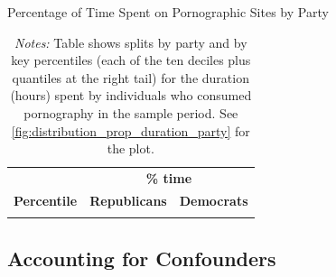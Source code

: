\documentclass[12pt, letterpaper]{article}
\begin{document}
\begin{table}[ht] \centering \small \setlength\tabcolsep{10 pt}
	\caption{Percentage of Time Spent on Pornographic Sites by Party}
	\label{tab:distribution_prop_duration_party}
	\begin{adjustbox}{max width=\textwidth}
		\begin{tabular}{crr}
			\toprule
			\multicolumn{1}{l}{\textbf{}}&\multicolumn{2}{c}{\textbf{\% time}}\\
			\cmidrule(l){2-3}
			\multicolumn{1}{l}{\textbf{Percentile}}&\multicolumn{1}{c}{\textbf{Republicans}}&\multicolumn{1}{c}{\textbf{Democrats}}\\
			\midrule
			\\
			\bottomrule
		\end{tabular}
	\end{adjustbox}
	\caption*{\footnotesize \emph{Notes:} 
		Table shows splits by party and by key percentiles (each of the ten deciles plus quantiles at the right tail) for the duration (hours) spent by individuals who consumed pornography in the sample period. See \cref{fig:distribution_prop_duration_party} for the plot.
	}
\end{table}

\subsection{Accounting for Confounders}
\end{document}
